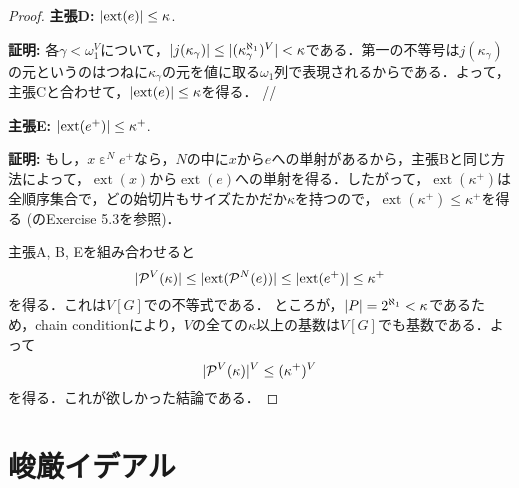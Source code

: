 \documentclass[uplatex]{jsarticle}
\newcommand{\Pow}{\mathcal{P}}
\newcommand{\ext}{\operatorname{ext}}
\DeclarePairedDelimiter\abs{\lvert}{\rvert}
\theoremstyle{definition}
\begin{document}
\begin{proof}
		\par \textbf{主張D: } $\abs{\ext(e)} \le \kappa$.
		\par \textbf{証明: } 各$\gamma < \omega_1^V$について，$\abs{j(\kappa_\gamma)} \le \abs{(\kappa_\gamma^{\aleph_1})^V} < \kappa$である．第一の不等号は$j(\kappa_\gamma)$の元というのはつねに$\kappa_\gamma$の元を値に取る$\omega_1$列で表現されるからである．よって，主張Cと合わせて，$\abs{\ext(e)} \le \kappa$を得る．  \hfill //
		
		\par \textbf{主張E: } $\abs{\ext(e^+)} \le \kappa^+$.
		\par \textbf{証明: } もし，$x \mathrel{\varepsilon}^N e^+$なら，$N$の中に$x$から$e$への単射があるから，主張Bと同じ方法によって，$\ext(x)$から$\ext(e)$への単射を得る．したがって，$\ext(\kappa^+)$は全順序集合で，どの始切片もサイズたかだか$\kappa$を持つので，$\ext(\kappa^+) \le \kappa^+$を得る (\cite{jech2006set}のExercise 5.3を参照)．	
		
		主張A, B, Eを組み合わせると
		\[
			\abs{\Pow^V(\kappa)} \le \abs{\ext(\Pow^N(e))} \le \abs{\ext(e^+)} \le \kappa^+
		\]
		を得る．これは$V[G]$での不等式である．
		ところが，$\abs{P} = 2^{\aleph_1} < \kappa$であるため，chain conditionにより，$V$の全ての$\kappa$以上の基数は$V[G]$でも基数である．よって
		\[
		\abs{\Pow^V(\kappa)}^V \le (\kappa^+)^V
		\]
		を得る．これが欲しかった結論である．
	 \end{proof}
	
	\section{峻厳イデアル}
	
	\nocite{*}
	\printbibliography[title={参考文献}]

	
\end{document}
